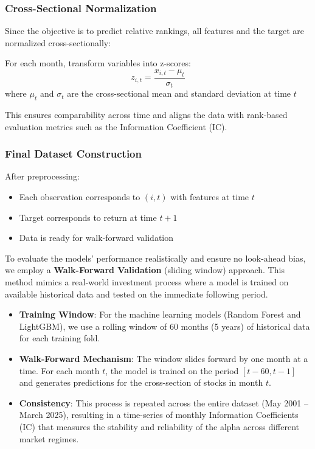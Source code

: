 \documentclass[11pt]{article}
\begin{document}
\subsubsection{Cross-Sectional Normalization}

Since the objective is to predict relative rankings, all features and the target are normalized cross-sectionally:

For each month, transform variables into z-scores:
    \[
    z_{i,t} = \frac{x_{i,t} - \mu_t}{\sigma_t}
    \]
where $\mu_t$ and $\sigma_t$ are the cross-sectional mean and standard deviation at time $t$

This ensures comparability across time and aligns the data with rank-based evaluation metrics such as the Information Coefficient (IC).

\subsubsection{Final Dataset Construction}

After preprocessing:
\begin{itemize}
    \item Each observation corresponds to $(i, t)$ with features at time $t$
    \item Target corresponds to return at time $t+1$
    \item Data is ready for walk-forward validation
\end{itemize}


To evaluate the models' performance realistically and ensure no look-ahead bias, we employ a \textbf{Walk-Forward Validation} (sliding window) approach. This method mimics a real-world investment process where a model is trained on available historical data and tested on the immediate following period.

\begin{itemize}
    \item \textbf{Training Window}: For the machine learning models (Random Forest and LightGBM), we use a rolling window of 60 months (5 years) of historical data for each training fold.
    \item \textbf{Walk-Forward Mechanism}: The window slides forward by one month at a time. For each month $t$, the model is trained on the period $[t-60, t-1]$ and generates predictions for the cross-section of stocks in month $t$.
    \item \textbf{Consistency}: This process is repeated across the entire dataset (May 2001 -- March 2025), resulting in a time-series of monthly Information Coefficients (IC) that measures the stability and reliability of the alpha across different market regimes.
\end{itemize}
\end{document}
